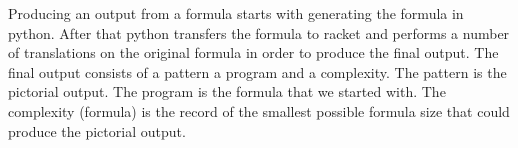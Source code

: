 
Producing an output from a formula starts with generating the formula in python. After
that python transfers the formula to racket and performs a number of translations on the original formula in
order to produce the final output.
The final output consists of a pattern a program and a complexity.
The pattern is the pictorial output.
The program is the formula that we started with.
The complexity (formula) is the record of the smallest possible formula size that could produce the pictorial output.

